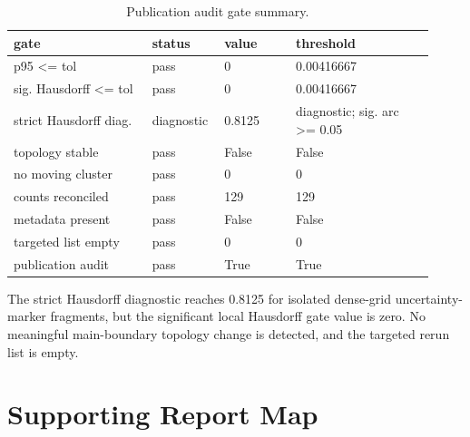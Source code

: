 \documentclass[11pt]{article}
\begin{document}
\begin{table}[H]
\centering
\small
\begin{tabular}{@{}p{0.31\linewidth}p{0.14\linewidth}p{0.16\linewidth}p{0.31\linewidth}@{}}
\toprule
gate & status & value & threshold \\
\midrule
p95 <= tol & pass & 0 & 0.00416667 \\
sig. Hausdorff <= tol & pass & 0 & 0.00416667 \\
strict Hausdorff diag. & diagnostic & 0.8125 & diagnostic; sig. arc >= 0.05 \\
topology stable & pass & False & False \\
no moving cluster & pass & 0 & 0 \\
counts reconciled & pass & 129 & 129 \\
metadata present & pass & False & False \\
targeted list empty & pass & 0 & 0 \\
publication audit & pass & True & True \\
\bottomrule
\end{tabular}
\caption{Publication audit gate summary.}
\end{table}

The strict Hausdorff diagnostic reaches 0.8125 for isolated dense-grid uncertainty-marker fragments, but the significant local Hausdorff gate value is zero.  No meaningful main-boundary topology change is detected, and the targeted rerun list is empty.

\section{Supporting Report Map}
\end{document}
